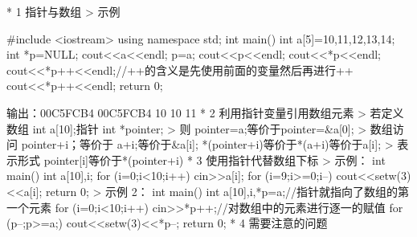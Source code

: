   * 1 指针与数组
     > 示例

          #include <iostream>
          using namespace std;
          int main()
          {
              int a[5]={10,11,12,13,14};
              int *p=NULL;
              cout<<a<<endl;
              p=a;
              cout<<p<<endl;
              cout<<*p<<endl;
              cout<<*p++<<endl;//++的含义是先使用前面的变量然后再进行++
              cout<<*p++<<endl;
              return 0;
          }

          输出：00C5FCB4
               00C5FCB4
               10
               10
               11
  * 2 利用指针变量引用数组元素
     > 若定义
        数组 int a[10];指针 int *pointer;
     > 则
        pointer=a;等价于pointer=&a[0];
     > 数组访问
        pointer+i；等价于 a+i;等价于&a[i];
        *(pointer+i)等价于*(a+i)等价于a[i];
     > 表示形式
        pointer[i]等价于*(pointer+i)
  * 3 使用指针代替数组下标
     > 示例：
        int main()
        {
           int a[10],i;
           for (i=0;i<10;i++)
               cin>>a[i];
           for (i=9;i>=0;i--)
               cout<<setw(3)<<a[i];
           return 0;
        }
    > 示例 2：
        int main()
        {
           int a[10],i,*p=a;//指针就指向了数组的第一个元素
           for (i=0;i<10;i++)
                cin>>*p++;//对数组中的元素进行逐一的赋值
           for (p--;p>=a;)
                cout<<setw(3)<<*p--;
           return 0;
        }
  * 4 需要注意的问题

